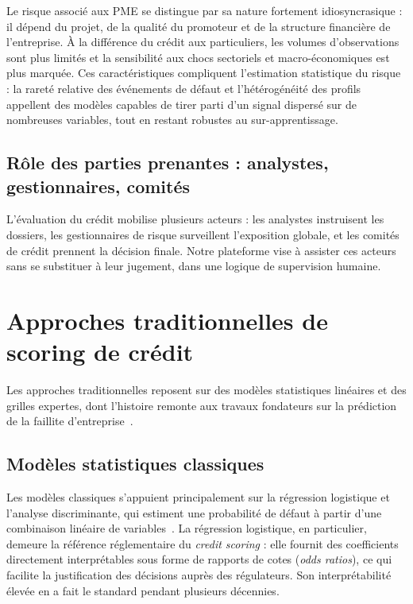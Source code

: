 \documentclass[a4paper,12pt,oneside]{report}
\begin{document}
Le risque associé aux PME se distingue par sa nature fortement idiosyncrasique : il dépend
du projet, de la qualité du promoteur et de la structure financière de l'entreprise. À la
différence du crédit aux particuliers, les volumes d'observations sont plus limités et la
sensibilité aux chocs sectoriels et macro-économiques est plus marquée. Ces caractéristiques
compliquent l'estimation statistique du risque : la rareté relative des événements de défaut
et l'hétérogénéité des profils appellent des modèles capables de tirer parti d'un signal
dispersé sur de nombreuses variables, tout en restant robustes au sur-apprentissage.

\subsection{Rôle des parties prenantes : analystes, gestionnaires, comités}

L'évaluation du crédit mobilise plusieurs acteurs : les analystes instruisent les dossiers,
les gestionnaires de risque surveillent l'exposition globale, et les comités de crédit
prennent la décision finale. Notre plateforme vise à assister ces acteurs sans se
substituer à leur jugement, dans une logique de supervision humaine.

\section{Approches traditionnelles de scoring de crédit}

Les approches traditionnelles reposent sur des modèles statistiques linéaires et des grilles
expertes, dont l'histoire remonte aux travaux fondateurs sur la prédiction de la faillite
d'entreprise~\cite{altman1968}.

\subsection{Modèles statistiques classiques}

Les modèles classiques s'appuient principalement sur la régression logistique et l'analyse
discriminante, qui estiment une probabilité de défaut à partir d'une combinaison linéaire de
variables~\cite{hosmer2013}. La régression logistique, en particulier, demeure la référence
réglementaire du \textit{credit scoring} : elle fournit des coefficients directement
interprétables sous forme de rapports de cotes (\textit{odds ratios}), ce qui facilite la
justification des décisions auprès des régulateurs. Son interprétabilité élevée en a fait le
standard pendant plusieurs décennies.
\end{document}
